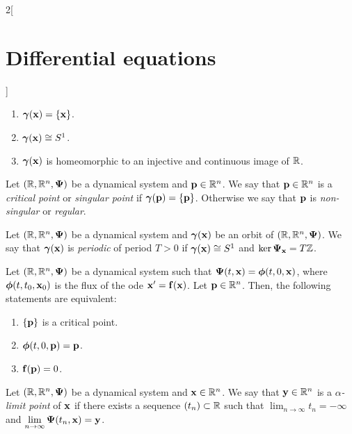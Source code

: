 \documentclass[../../../main.tex]{subfiles}
\begin{document}
\begin{multicols}{2}[\section{Differential equations}]
\begin{prop}
    \begin{enumerate}
      \item $\boldsymbol{\mathrm{\gamma}}(\boldsymbol{\mathrm{x}})=\{\boldsymbol{\mathrm{x}}\}$.
      \item $\boldsymbol{\mathrm{\gamma}}(\boldsymbol{\mathrm{x}})\cong S^1$.
      \item $\boldsymbol{\mathrm{\gamma}}(\boldsymbol{\mathrm{x}})$ is homeomorphic to an injective and continuous image of $\mathbb{R}$.
    \end{enumerate}
  \end{prop}
  \begin{definition}
    Let $(\mathbb{R},\mathbb{R}^n,\boldsymbol{\mathrm{\Psi}})$ be a dynamical system and $\boldsymbol{\mathrm{p}}\in\mathbb{R}^n$. We say that $\boldsymbol{\mathrm{p}}\in\mathbb{R}^n$ is a \textit{critical point} or \textit{singular point} if $\boldsymbol{\mathrm{\gamma}}(\boldsymbol{\mathrm{p}})=\{\boldsymbol{\mathrm{p}}\}$. Otherwise we say that $\boldsymbol{\mathrm{p}}$ is \textit{non-singular} or \textit{regular}.
  \end{definition}
  \begin{definition}
    Let $(\mathbb{R},\mathbb{R}^n,\boldsymbol{\mathrm{\Psi}})$ be a dynamical system and $\boldsymbol{\mathrm{\gamma}}(\boldsymbol{\mathrm{x}})$ be an orbit of $(\mathbb{R},\mathbb{R}^n,\boldsymbol{\mathrm{\Psi}})$. We say that $\boldsymbol{\mathrm{\gamma}}(\boldsymbol{\mathrm{x}})$ is \textit{periodic} of period $T>0$ if $\boldsymbol{\mathrm{\gamma}}(\boldsymbol{\mathrm{x}})\cong S^1$ and $\ker\boldsymbol{\mathrm{\Psi_{\boldsymbol{\mathrm{x}}}}}=T\mathbb{Z}$.
  \end{definition}
  \begin{prop}
    Let $(\mathbb{R},\mathbb{R}^n,\boldsymbol{\mathrm{\Psi}})$ be a dynamical system such that $\boldsymbol{\mathrm{\Psi}}(t,\boldsymbol{\mathrm{x}})=\boldsymbol{\mathrm{\phi}}(t,0,\boldsymbol{\mathrm{x}})$, where $\boldsymbol{\mathrm{\phi}}(t,t_0,\boldsymbol{\mathrm{x}}_0)$ is the flux of the ode $\boldsymbol{\mathrm{x}}' =\boldsymbol{\mathrm{f}}(\boldsymbol{\mathrm{x}})$. Let $\boldsymbol{\mathrm{p}}\in\mathbb{R}^n$. Then, the following statements are equivalent:
    \begin{enumerate}
      \item $\{\boldsymbol{\mathrm{p}}\}$ is a critical point.
      \item $\boldsymbol{\mathrm{\phi}}(t,0,\boldsymbol{\mathrm{p}})=\boldsymbol{\mathrm{p}}$.
      \item $\boldsymbol{\mathrm{f}}(\boldsymbol{\mathrm{p}})=0$.
    \end{enumerate}
  \end{prop}
  \begin{definition}
    Let $(\mathbb{R},\mathbb{R}^n,\boldsymbol{\mathrm{\Psi}})$ be a dynamical system and $\boldsymbol{\mathrm{x}}\in\mathbb{R}^n$. We say that $\boldsymbol{\mathrm{y}}\in\mathbb{R}^n$ is a \textit{$\alpha$-limit point} of $\boldsymbol{\mathrm{x}}$ if there exists a sequence $(t_n)\subset\mathbb{R}$ such that $\displaystyle\lim_{n\to\infty}t_n=-\infty$ and $\displaystyle\lim_{n\to\infty}\boldsymbol{\mathrm{\Psi}}(t_n,\boldsymbol{\mathrm{x}})=\boldsymbol{\mathrm{y}}$.

\end{definition}
\end{multicols}
\end{document}

